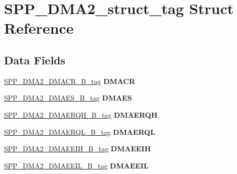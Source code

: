 \hypertarget{structSPP__DMA2__struct__tag}{}\section{S\+P\+P\+\_\+\+D\+M\+A2\+\_\+struct\+\_\+tag Struct Reference}
\label{structSPP__DMA2__struct__tag}
\subsection*{Data Fields}
\begin{DoxyCompactItemize}
\item 
\mbox{\label{structSPP__DMA2__struct__tag_a1c3d64fc7d3b14300421468c83d1a67a}} 
\mbox{\hyperlink{unionSPP__DMA2__DMACR__32B__tag}{S\+P\+P\+\_\+\+D\+M\+A2\+\_\+\+D\+M\+A\+C\+R\+\_\+B\+\_\+tag}} {\bfseries D\+M\+A\+CR}
\item 
\mbox{\label{structSPP__DMA2__struct__tag_a1fffdb9d0758b8de72bec17000bb3875}} 
\mbox{\hyperlink{unionSPP__DMA2__DMAES__32B__tag}{S\+P\+P\+\_\+\+D\+M\+A2\+\_\+\+D\+M\+A\+E\+S\+\_\+B\+\_\+tag}} {\bfseries D\+M\+A\+ES}
\item 
\mbox{\label{structSPP__DMA2__struct__tag_aec4c65c42bad405e97efdd4d11fb2867}} 
\mbox{\hyperlink{unionSPP__DMA2__DMAERQH__32B__tag}{S\+P\+P\+\_\+\+D\+M\+A2\+\_\+\+D\+M\+A\+E\+R\+Q\+H\+\_\+B\+\_\+tag}} {\bfseries D\+M\+A\+E\+R\+QH}
\item 
\mbox{\label{structSPP__DMA2__struct__tag_aea6033e795aa65c23db982c20d3a98d5}} 
\mbox{\hyperlink{unionSPP__DMA2__DMAERQL__32B__tag}{S\+P\+P\+\_\+\+D\+M\+A2\+\_\+\+D\+M\+A\+E\+R\+Q\+L\+\_\+B\+\_\+tag}} {\bfseries D\+M\+A\+E\+R\+QL}
\item 
\mbox{\label{structSPP__DMA2__struct__tag_a291aaf07721f7c557805b902e6a703a4}} 
\mbox{\hyperlink{unionSPP__DMA2__DMAEEIH__32B__tag}{S\+P\+P\+\_\+\+D\+M\+A2\+\_\+\+D\+M\+A\+E\+E\+I\+H\+\_\+B\+\_\+tag}} {\bfseries D\+M\+A\+E\+E\+IH}
\item 
\mbox{\label{structSPP__DMA2__struct__tag_a0362a317ed22a6cdd4a8cf56746abe7d}} 
\mbox{\hyperlink{unionSPP__DMA2__DMAEEIL__32B__tag}{S\+P\+P\+\_\+\+D\+M\+A2\+\_\+\+D\+M\+A\+E\+E\+I\+L\+\_\+B\+\_\+tag}} {\bfseries D\+M\+A\+E\+E\+IL}

\end{DoxyCompactItemize}
